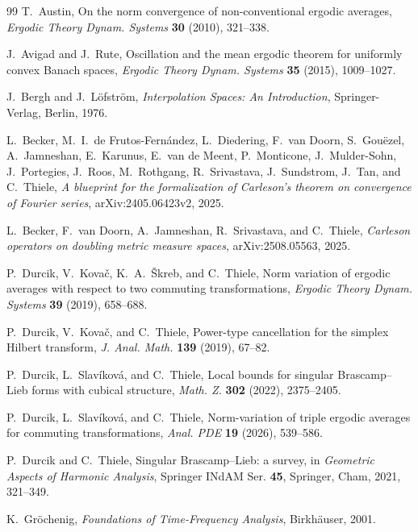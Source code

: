 \documentclass[12pt,reqno]{amsart}
\theoremstyle{plain}
\numberwithin{equation}{section}
\theoremstyle{remark}
\begin{document}
\begin{thebibliography}{99}
T.~Austin,
On the norm convergence of non-conventional ergodic averages,
\emph{Ergodic Theory Dynam. Systems} \textbf{30} (2010), 321--338.

J.~Avigad and J.~Rute,
Oscillation and the mean ergodic theorem for uniformly convex Banach spaces,
\emph{Ergodic Theory Dynam. Systems} \textbf{35} (2015), 1009--1027.

J.~Bergh and J.~L\"ofstr\"om,
\emph{Interpolation Spaces: An Introduction},
Springer-Verlag, Berlin, 1976.

L.~Becker, M.~I.~de Frutos-Fernández, L.~Diedering, F.~van Doorn,
S.~Gouëzel, A.~Jamneshan, E.~Karunus, E.~van de Meent,
P.~Monticone, J.~Mulder-Sohn, J.~Portegies, J.~Roos,
M.~Rothgang, R.~Srivastava, J.~Sundstrom, J.~Tan, and C.~Thiele,
\emph{A blueprint for the formalization of Carleson's theorem on convergence of Fourier series},
arXiv:2405.06423v2, 2025.

L.~Becker, F.~van Doorn, A.~Jamneshan, R.~Srivastava, and C.~Thiele,
\emph{Carleson operators on doubling metric measure spaces},
arXiv:2508.05563, 2025.

P.~Durcik, V.~Kova\v{c}, K.~A.~\v{S}kreb, and C.~Thiele,
Norm variation of ergodic averages with respect to two commuting transformations,
\emph{Ergodic Theory Dynam. Systems} \textbf{39} (2019), 658--688.

P.~Durcik, V.~Kova\v{c}, and C.~Thiele,
Power-type cancellation for the simplex Hilbert transform,
\emph{J. Anal. Math.} \textbf{139} (2019), 67--82.

P.~Durcik, L.~Slav\'ikov\'a, and C.~Thiele,
Local bounds for singular Brascamp--Lieb forms with cubical structure,
\emph{Math. Z.} \textbf{302} (2022), 2375--2405.

P.~Durcik, L.~Slav\'ikov\'a, and C.~Thiele,
Norm-variation of triple ergodic averages for commuting transformations,
\emph{Anal. PDE} \textbf{19} (2026), 539--586.

P.~Durcik and C.~Thiele,
Singular Brascamp--Lieb: a survey,
in \emph{Geometric Aspects of Harmonic Analysis},
Springer INdAM Ser. \textbf{45},
Springer, Cham, 2021, 321--349.

K.~Gr\"ochenig,
\emph{Foundations of Time-Frequency Analysis},
Birkh\"auser, 2001.


\end{thebibliography}
\end{document}
